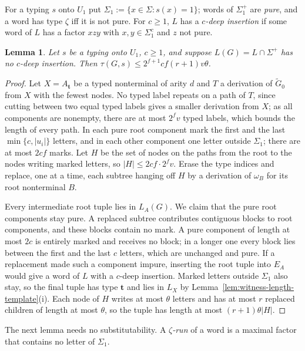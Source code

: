 \documentclass[11pt]{article}
\numberwithin{equation}{section}
\theoremstyle{plain}
\newtheorem{lemma}[theorem]{Lemma}
\theoremstyle{definition}
\theoremstyle{remark}
\theoremstyle{plain}
\begin{document}
For a typing $s$ onto $U_1$ put $\Sigma_1:=\{x\in\Sigma:s(x)=1\}$; words of
$\Sigma_1^+$ are \emph{pure}, and a word has type $\zeta$ iff it is not pure.  For
$c\ge1$, $L$ has a \emph{$c$-deep insertion} if some word of $L$ has a factor
$xzy$ with $x,y\in\Sigma_1^c$ and $z$ not pure.

\begin{lemma}\label{lem:app-u1-shallow}
Let $s$ be a typing onto $U_1$, $c\ge1$, and suppose $L(G)=L\cap\Sigma^+$ has no
$c$-deep insertion.  Then $\tau(G,s)\le2^{f+1}cf(r+1)v\theta$.
\end{lemma}

\begin{proof}
Let $X=A_{\mathbf t}$ be a typed nonterminal of arity $d$ and $T$ a derivation of
$\widetilde G_0$ from $X$ with the fewest nodes.  No typed label repeats on a path
of $T$, since cutting between two equal typed labels gives a smaller derivation
from $X$; as all components are nonempty, there are at most $2^fv$ typed labels,
which bounds the length of every path.  In each pure root component mark the
first and the last $\min\{c,|u_i|\}$ letters, and in each other component one
letter outside $\Sigma_1$; there are at most $2cf$ marks.  Let $H$ be the set of
nodes on the paths from the root to the nodes writing marked letters, so
$|H|\le2cf\cdot2^fv$.  Erase the type indices and replace, one at a time, each
subtree hanging off $H$ by a derivation of $\omega_B$ for its root nonterminal $B$.

Every intermediate root tuple lies in $L_A(G)$.  We claim that the pure root
components stay pure.  A replaced subtree contributes contiguous blocks to root
components, and these blocks contain no mark.  A pure component of length at
most $2c$ is entirely marked and receives no block; in a longer one every block
lies between the first and the last $c$ letters, which are unchanged and pure.
If a replacement made such a component impure, inserting the root tuple into
$E_A$ would give a word of $L$ with a $c$-deep insertion.  Marked letters outside
$\Sigma_1$ also stay, so the final tuple has type $\mathbf t$ and lies in $L_X$ by
Lemma~\ref{lem:witness-length-template}(i).  Each node of $H$ writes at most
$\theta$ letters and has at most $r$ replaced children of length at most
$\theta$, so the tuple has length at most $(r+1)\theta|H|$.
\end{proof}

The next lemma needs no substitutability.  A \emph{$\zeta$-run} of a word is a
maximal factor that contains no letter of $\Sigma_1$.
\end{document}
